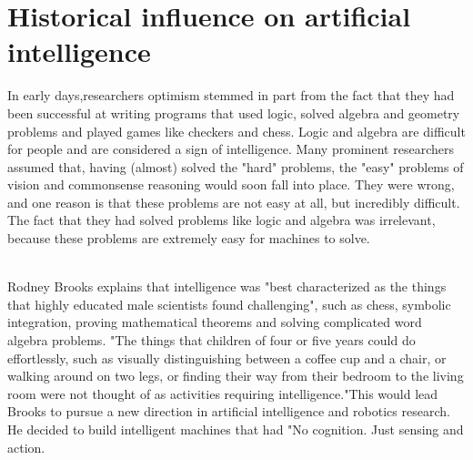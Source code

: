 \documentclass[a4paper,10pt]{article}
\begin{document}
\section{Historical influence on artificial intelligence}
In early days,researchers optimism stemmed in part from the fact that they had been successful at writing programs that used logic, solved algebra and geometry problems and played games like checkers and chess. Logic and algebra are difficult for people and are considered a sign of intelligence. Many prominent researchers assumed that, having (almost) solved the "hard" problems, the "easy" problems of vision and commonsense reasoning would soon fall into place. They were wrong, and one reason is that these problems are not easy at all, but incredibly difficult. The fact that they had solved problems like logic and algebra was irrelevant, because these problems are extremely easy for machines to solve.

\textbf{}
\\ Rodney Brooks explains that  intelligence was "best characterized as the things that highly educated male scientists found challenging", such as chess, symbolic integration, proving mathematical theorems and solving complicated word algebra problems. "The things that children of four or five years could do effortlessly, such as visually distinguishing between a coffee cup and a chair, or walking around on two legs, or finding their way from their bedroom to the living room were not thought of as activities requiring intelligence."This would lead Brooks to pursue a new direction in artificial intelligence and robotics research. He decided to build intelligent machines that had "No cognition. Just sensing and action.
\end{document}
